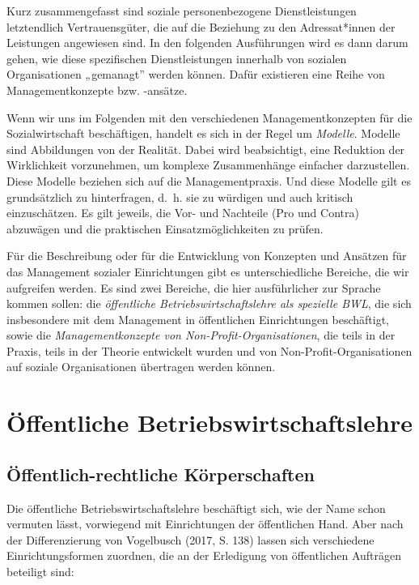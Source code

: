 \documentclass[
  letterpaper,
]{book}
\begin{document}
Kurz zusammengefasst sind soziale personenbezogene Dienstleistungen
letztendlich Vertrauensgüter, die auf die Beziehung zu den
Adressat*innen der Leistungen angewiesen sind. In den folgenden
Ausführungen wird es dann darum gehen, wie diese spezifischen
Dienstleistungen innerhalb von sozialen Organisationen „gemanagt''
werden können. Dafür existieren eine Reihe von Managementkonzepte bzw.
-ansätze.

Wenn wir uns im Folgenden mit den verschiedenen Managementkonzepten für
die Sozialwirtschaft beschäftigen, handelt es sich in der Regel um
\emph{Modelle}. Modelle sind Abbildungen von der Realität. Dabei wird
beabsichtigt, eine Reduktion der Wirklichkeit vorzunehmen, um komplexe
Zusammenhänge einfacher darzustellen. Diese Modelle beziehen sich auf
die Managementpraxis. Und diese Modelle gilt es grundsätzlich zu
hinterfragen, d.~h. sie zu würdigen und auch kritisch einzuschätzen. Es
gilt jeweils, die Vor- und Nachteile (Pro und Contra) abzuwägen und die
praktischen Einsatzmöglichkeiten zu prüfen.

Für die Beschreibung oder für die Entwicklung von Konzepten und Ansätzen
für das Management sozialer Einrichtungen gibt es unterschiedliche
Bereiche, die wir aufgreifen werden. Es sind zwei Bereiche, die hier
ausführlicher zur Sprache kommen sollen: die \emph{öffentliche
Betriebswirtschaftslehre als spezielle BWL}, die sich insbesondere mit
dem Management in öffentlichen Einrichtungen beschäftigt, sowie die
\emph{Managementkonzepte von Non-Profit-Organisationen}, die teils in
der Praxis, teils in der Theorie entwickelt wurden und von
Non-Profit-Organisationen auf soziale Organisationen übertragen werden
können.

\section{Öffentliche
Betriebswirtschaftslehre}\label{oeffentliche-betriebswirtschaftslehre}

\subsection{Öffentlich-rechtliche
Körperschaften}\label{oeffentlich-rechtliche-krperschaften}

Die öffentliche Betriebswirtschaftslehre beschäftigt sich, wie der Name
schon vermuten lässt, vorwiegend mit Einrichtungen der öffentlichen
Hand. Aber nach der Differenzierung von Vogelbusch (2017, S. 138) lassen
sich verschiedene Einrichtungsformen zuordnen, die an der Erledigung von
öffentlichen Aufträgen beteiligt sind:
\end{document}
